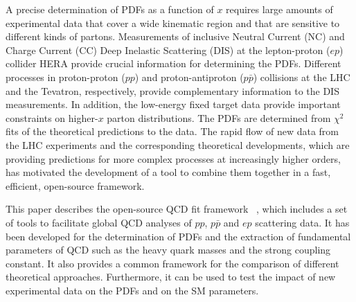A precise determination of PDFs as a function of $x$ requires large amounts of
experimental data that cover a wide kinematic region and that are sensitive to different kinds of partons. Measurements of inclusive Neutral Current (NC) and Charge Current (CC) Deep Inelastic Scattering (DIS) at the lepton-proton ($ep$) collider HERA provide crucial information for determining the PDFs. 
Different processes in  proton-proton ($pp$) and proton-antiproton ($p \bar p$) collisions at the LHC and the Tevatron, respectively, 
provide complementary information to the DIS measurements.
In addition, the low-energy fixed target data provide important constraints on higher-$x$ parton distributions.
 The PDFs are determined
from $\chi^2$ fits of the theoretical predictions to the 
data. 
The rapid flow of new data from the LHC experiments and the corresponding theoretical developments, which are providing predictions for more complex processes at increasingly higher orders, has motivated the development of a tool to combine them  together in a fast, efficient, open-source framework.
%

This paper describes the open-source QCD fit framework \fitter~\cite{herafitter:page}, which includes a set of tools to facilitate global 
QCD analyses of $pp$, $p\bar{p}$ and $ep$ scattering data. 
It has been developed for the determination of PDFs and the extraction of fundamental parameters of QCD such as the heavy
quark masses and the strong coupling constant. It also provides a common framework for the
comparison of different theoretical approaches. Furthermore, it can be used to test the impact 
of new experimental data on the PDFs and on the SM parameters.

